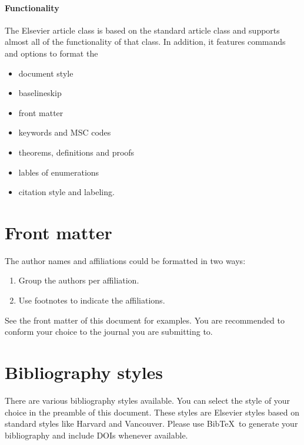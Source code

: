 \documentclass[]{elsarticle} %
\begin{document}
\hypertarget{functionality}{%
\paragraph{Functionality}\label{functionality}}

The Elsevier article class is based on the standard article class and
supports almost all of the functionality of that class. In addition, it
features commands and options to format the

\begin{itemize}
\item
  document style
\item
  baselineskip
\item
  front matter
\item
  keywords and MSC codes
\item
  theorems, definitions and proofs
\item
  lables of enumerations
\item
  citation style and labeling.
\end{itemize}

\hypertarget{front-matter}{%
\section{Front matter}\label{front-matter}}

The author names and affiliations could be formatted in two ways:

\begin{enumerate}
\def\labelenumi{(\arabic{enumi})}
\item
  Group the authors per affiliation.
\item
  Use footnotes to indicate the affiliations.
\end{enumerate}

See the front matter of this document for examples. You are recommended
to conform your choice to the journal you are submitting to.

\hypertarget{bibliography-styles}{%
\section{Bibliography styles}\label{bibliography-styles}}

There are various bibliography styles available. You can select the
style of your choice in the preamble of this document. These styles are
Elsevier styles based on standard styles like Harvard and Vancouver.
Please use BibTeX~to generate your bibliography and include DOIs
whenever available.
\end{document}
